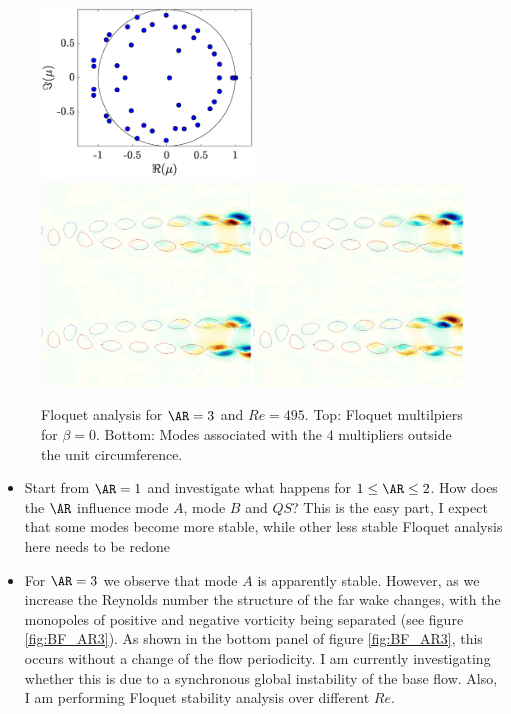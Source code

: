 \documentclass[onecolumn,notitlepage,superscriptaddress, amsmath,amssymb,longbibliographyaps,floatfix]{revtex4-1}
\begin{document}
\begin{figure}
  \centering
  \includegraphics[width=0.5\textwidth]{./fig/AR3/mult_Re495_beta0.eps}
  \includegraphics[width=1.0\textwidth]{./fig/AR3/Floquet_modes_beta_0_Re495.png}
  \caption{Floquet analysis for $\AR=3$ and $Re=495$. Top: Floquet multilpiers for $\beta = 0$. Bottom: Modes associated with the $4$ multipliers outside the unit circumference.}
  \label{fig:AR3_Stab}
\end{figure}


\begin{itemize}
  \item Start from $\AR=1$ and investigate what happens for $1 \le \AR \le 2$. How does the $\AR$ influence mode $A$, mode $B$ and $QS$? This is the easy part, I expect that some modes become more stable, while other less stable {\color{red} Floquet analysis here needs to be redone}
  \item For $\AR=3$ we observe that mode $A$ is apparently stable. However, as we increase the Reynolds number the structure of the far wake changes, with the monopoles of positive and negative vorticity being separated (see figure \ref{fig:BF_AR3}). As shown in the bottom panel of figure \ref{fig:BF_AR3}, this occurs without a change of the flow periodicity. {\color{red} I am currently investigating whether this is due to a synchronous global instability of the base flow. Also, I am performing Floquet stability analysis over different $Re$.}
\end{itemize}
\end{document}
